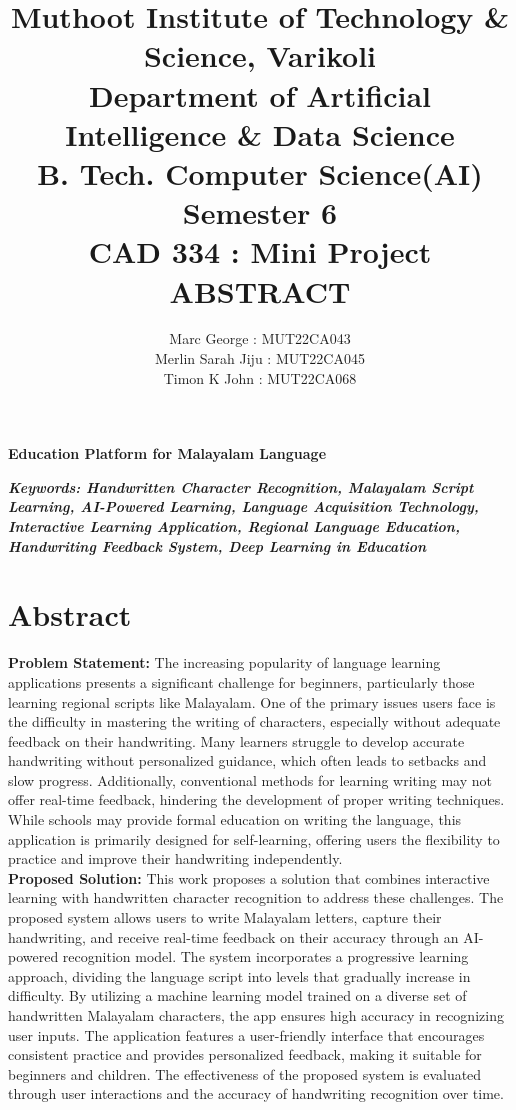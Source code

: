 \documentclass{article}
\title{Muthoot Institute of Technology \& Science, Varikoli
\\Department of Artificial Intelligence \& Data Science
\\B. Tech. Computer Science(AI)
\\Semester 6 
\\CAD 334 : Mini Project
\\ \textbf{ABSTRACT}}
\author{
    Marc George : MUT22CA043\\
    Merlin Sarah Jiju : MUT22CA045\\
    Timon K John : MUT22CA068
}
\begin{document}
 

\maketitle
	

\begin {center} {\large {\bf Education Platform for Malayalam Language}} \end {center}
{\textit{\textbf{Keywords: Handwritten Character Recognition, Malayalam Script Learning, AI-Powered Learning, Language Acquisition Technology, Interactive Learning Application, Regional Language Education, Handwriting Feedback System, Deep Learning in Education}}}

\section{Abstract}
\hspace{1cm}\textbf{Problem Statement:}
The increasing popularity of language learning applications presents a significant challenge for beginners, particularly those learning regional scripts like Malayalam. One of the primary issues users face is the difficulty in mastering the writing of characters, especially without adequate feedback on their handwriting. Many learners struggle to develop accurate handwriting without personalized guidance, which often leads to setbacks and slow progress. Additionally, conventional methods for learning writing may not offer real-time feedback, hindering the development of proper writing techniques. While schools may provide formal education on writing the language, this application is primarily designed for self-learning, offering users the flexibility to practice and improve their handwriting independently.\\

\noindent\hspace{1cm}\textbf{Proposed Solution:} 
This work proposes a solution that combines interactive learning with handwritten character recognition to address these challenges. The proposed system allows users to write Malayalam letters, capture their handwriting, and receive real-time feedback on their accuracy through an AI-powered recognition model. The system incorporates a progressive learning approach, dividing the language script into levels that gradually increase in difficulty. By utilizing a machine learning model trained on a diverse set of handwritten Malayalam characters, the app ensures high accuracy in recognizing user inputs. The application features a user-friendly interface that encourages consistent practice and provides personalized feedback, making it suitable for beginners and children. The effectiveness of the proposed system is evaluated through user interactions and the accuracy of handwriting recognition over time.
\end{document}
